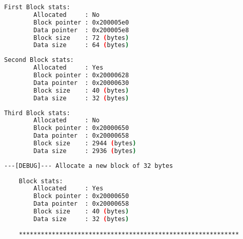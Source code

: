     \begin{outputbox}
    \begin{lstlisting}[language=bash]
    First Block stats:
        Allocated     : No
        Block pointer : 0x200005e0
        Data pointer  : 0x200005e8
        Block size    : 72 (bytes)
        Data size     : 64 (bytes)
    \end{lstlisting}
    \end{outputbox}
    
    \begin{outputbox}
    \begin{lstlisting}[language=bash]
    Second Block stats:
        Allocated     : Yes
        Block pointer : 0x20000628
        Data pointer  : 0x20000630
        Block size    : 40 (bytes)
        Data size     : 32 (bytes)
    \end{lstlisting}
    \end{outputbox}
    
    \begin{outputbox}
    \begin{lstlisting}[language=bash]
    Third Block stats:
        Allocated     : No
        Block pointer : 0x20000650
        Data pointer  : 0x20000658
        Block size    : 2944 (bytes)
        Data size     : 2936 (bytes)
    \end{lstlisting}
    \end{outputbox}
    
    \begin{outputbox}
    \begin{lstlisting}[language=bash]
    ---[DEBUG]--- Allocate a new block of 32 bytes
    
    Block stats:
        Allocated     : Yes
        Block pointer : 0x20000650
        Data pointer  : 0x20000658
        Block size    : 40 (bytes)
        Data size     : 32 (bytes)
    
    ************************************************************
    \end{lstlisting}
    \end{outputbox}